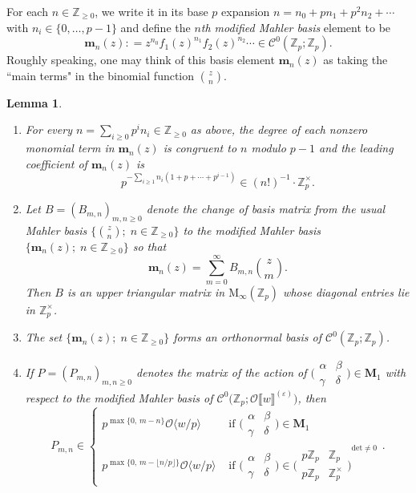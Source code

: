 \documentclass[12pt]{amsart}
\newtheorem{lemma}[subsection]{Lemma}
\theoremstyle{definition}
\numberwithin{equation}{subsection}
\def\calC{\mathcal{C}}
\def\calO{\mathcal{O}}
\def\ZZ{\mathbb{Z}}
\def\bfm{\mathbf{m}}
\def\bfM{\mathbf{M}}
\def\rmM{\mathrm{M}}
\renewcommand{\det}{\mathrm{det}}
\newcommand{\Matrix}[4]{{\big(\begin{smallmatrix}#1&#2\\#3& #4\end{smallmatrix} \big)}}
\begin{document}
For each $n \in \ZZ_{\geq 0}$, we write it in its base $p$ expansion $n =n_0+pn_1+p^2n_2+\cdots$ with $n_i \in \{0, \dots, p-1\}$ and define the \emph{$n$th modified Mahler basis} element to be
\begin{equation}
\label{E:modified Mahler basis}
\bfm_n(z): = z^{n_0}f_1(z)^{n_1}f_2(z)^{n_2}\cdots \in \calC^0(\ZZ_p; \ZZ_p).
\end{equation}
Roughly speaking, one may think of this basis element $\bfm_n(z)$ as taking the ``main terms" in the binomial function $\binom zn$. 
\begin{lemma}
\label{L:modified Mahler basis}
\begin{enumerate}
\item For every $n=\sum\limits_{i\geq 0}p^in_i\in \ZZ_{\geq 0}$ as above, the degree of each nonzero monomial term in $\bfm_n(z)$ is congruent to $n$ modulo $p-1$ and the leading coefficient of $\bfm_n(z)$ is 
\begin{equation}
\label{E:leading coefficient of mn(z)}
p^{-\sum\limits_{i\geq 1}n_i(1+p+\cdots +p^{i-1})} \in (n!)^{-1} \cdot \ZZ_p^\times.
\end{equation}
\item Let $B = (B_{m,n})_{m,n\geq 0}$ denote the change of basis matrix from the usual Mahler basis $\big\{\binom zn; \; n \in \ZZ_{\geq 0}\big\}$ to the modified Mahler basis $\{ \bfm_n(z); \; n \in \ZZ_{\geq 0} \}$ so that 
$$
\bfm_n(z)= \sum_{m = 0}^\infty B_{m,n} \binom zm.
$$
Then $B$ is an upper triangular matrix in $\rmM_\infty(\ZZ_p)$ whose diagonal entries lie in $\ZZ_p^\times$.

\item The set $\{ \bfm_n(z); \; n \in \ZZ_{\geq 0} \}$ forms an orthonormal basis of $\calC^0(\ZZ_p; \ZZ_p)$.

\item  If $P = (P_{m,n})_{m,n \geq 0}$ denotes the matrix of the action of $\Matrix \alpha\beta\gamma\delta \in \bfM_1$ with respect to the modified Mahler basis of $\calC^0\big(\ZZ_p; \calO\llbracket w \rrbracket ^{(\varepsilon)}\big)$, then
\begin{equation}
\label{E:P' halo bound}
P_{m,n} \in 
\begin{cases}
p^{\max\{0,\,m-n\}}\calO\langle w/p\rangle & \textrm{ if }\Matrix \alpha\beta\gamma\delta \in \bfM_1\\
p^{\max\{0,\,m - \lfloor n/p\rfloor\}} \calO\langle w/p\rangle &\textrm{ if }\Matrix \alpha\beta\gamma\delta \in \Matrix{p\ZZ_p}{\ZZ_p}{p\ZZ_p}{\ZZ_p^\times}^{\det \neq 0}
\end{cases}.
\end{equation}

\end{enumerate}

\end{lemma}
\end{document}
